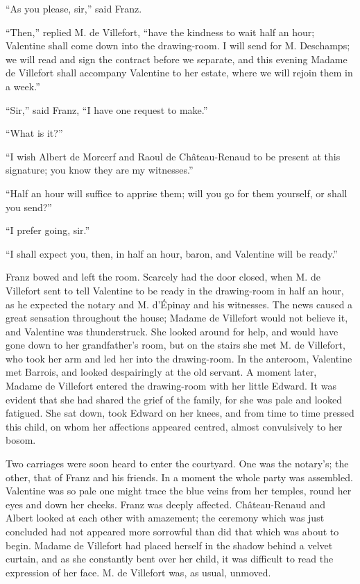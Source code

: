 “As you please, sir,” said Franz.

“Then,” replied M. de Villefort, “have the kindness to wait half an
hour; Valentine shall come down into the drawing-room. I will send for
M. Deschamps; we will read and sign the contract before we separate,
and this evening Madame de Villefort shall accompany Valentine to her
estate, where we will rejoin them in a week.”

“Sir,” said Franz, “I have one request to make.”

“What is it?”

“I wish Albert de Morcerf and Raoul de Château-Renaud to be present at
this signature; you know they are my witnesses.”

“Half an hour will suffice to apprise them; will you go for them
yourself, or shall you send?”

“I prefer going, sir.”

“I shall expect you, then, in half an hour, baron, and Valentine will
be ready.”

Franz bowed and left the room. Scarcely had the door closed, when M. de
Villefort sent to tell Valentine to be ready in the drawing-room in
half an hour, as he expected the notary and M. d’Épinay and his
witnesses. The news caused a great sensation throughout the house;
Madame de Villefort would not believe it, and Valentine was
thunderstruck. She looked around for help, and would have gone down to
her grandfather’s room, but on the stairs she met M. de Villefort, who
took her arm and led her into the drawing-room. In the anteroom,
Valentine met Barrois, and looked despairingly at the old servant. A
moment later, Madame de Villefort entered the drawing-room with her
little Edward. It was evident that she had shared the grief of the
family, for she was pale and looked fatigued. She sat down, took Edward
on her knees, and from time to time pressed this child, on whom her
affections appeared centred, almost convulsively to her bosom.

Two carriages were soon heard to enter the courtyard. One was the
notary’s; the other, that of Franz and his friends. In a moment the
whole party was assembled. Valentine was so pale one might trace the
blue veins from her temples, round her eyes and down her cheeks. Franz
was deeply affected. Château-Renaud and Albert looked at each other
with amazement; the ceremony which was just concluded had not appeared
more sorrowful than did that which was about to begin. Madame de
Villefort had placed herself in the shadow behind a velvet curtain, and
as she constantly bent over her child, it was difficult to read the
expression of her face. M. de Villefort was, as usual, unmoved.

